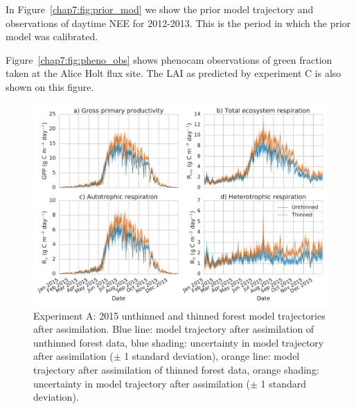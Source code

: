 In Figure~\ref{chap7:fig:prior_mod} we show the prior model trajectory and observations of daytime NEE for 2012-2013. This is the period in which the prior model was calibrated.

Figure~\ref{chap7:fig:pheno_obs} shows phenocam observations of green fraction taken at the Alice Holt flux site. The LAI as predicted by experiment C is also shown on this figure.

 
\begin{figure}
 \noindent\includegraphics[width=30pc]{chapter/chapter7/flux_compa.pdf}
\caption{Experiment A: 2015 unthinned and thinned forest model trajectories after assimilation. Blue line: model trajectory after assimilation of unthinned forest data, blue shading: uncertainty in model trajectory after assimilation (\(\pm\) 1 standard deviation), orange line: model trajectory after assimilation of thinned forest data, orange shading: uncertainty in model trajectory after assimilation (\(\pm\) 1 standard deviation).}
 \label{chap7:fig:fluxcompa}
 \end{figure}
 
